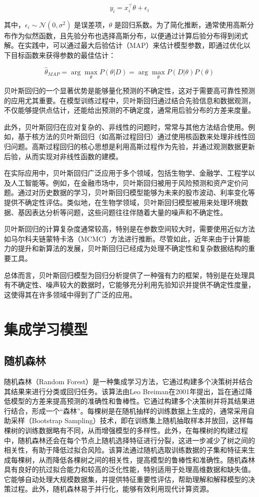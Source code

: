 \documentclass[AutoFakeBold]{LZUThesis-PgD&PhD}
\begin{document}
	\[
	y_i = x_i^\top \theta + \epsilon_i
	\]
	
	其中，$\epsilon_i \sim \mathcal{N}(0, \sigma^2)$ 是误差项，$\theta$ 是回归系数。为了简化推断，通常使用高斯分布作为似然函数，且先验分布也选择高斯分布，以便通过计算后验分布得到闭式解。在实践中，可以通过最大后验估计（MAP）来估计模型参数，即通过优化以下目标函数来获得参数的最佳估计：
	
	\[
	\hat{\theta}_{MAP} = \arg\max_\theta P(\theta | D) = \arg\max_\theta P(D | \theta) P(\theta)
	\]
	
	贝叶斯回归的一个显著优势是能够量化预测的不确定性，这对于需要高可靠性预测的应用尤其重要。在模型训练过程中，贝叶斯回归通过结合先验信息和数据观测，不仅能够提供点估计，还能给出预测的不确定度，通常用后验分布的方差来度量。
	
	此外，贝叶斯回归在应对复杂的、非线性的问题时，常常与其他方法结合使用。例如，基于核方法的贝叶斯回归（如高斯过程回归）通过使用核函数来处理非线性回归问题。高斯过程回归的核心思想是利用高斯过程作为先验，并通过观测数据更新后验，从而实现对非线性函数的建模。
	
	在实际应用中，贝叶斯回归广泛应用于多个领域，包括生物学、金融学、工程学以及人工智能等。例如，在金融市场中，贝叶斯回归被用于风险预测和资产定价问题。通过对历史数据的学习，贝叶斯回归模型能够为未来的股市波动、利率变化等提供不确定性评估。类似地，在生物学领域，贝叶斯回归模型被用来处理环境数据、基因表达分析等问题，这些问题往往伴随着大量的噪声和不确定性。
	
	贝叶斯回归的计算复杂度通常较高，特别是在参数空间较大时，需要使用近似方法如马尔科夫链蒙特卡洛（MCMC）方法进行推断。尽管如此，近年来由于计算能力的提升和新算法的发展，贝叶斯回归已经成为处理不确定性和复杂数据结构的重要工具。
	
	总体而言，贝叶斯回归模型为回归分析提供了一种强有力的框架，特别是在处理具有不确定性、噪声较大的数据时，它能够充分利用先验知识并提供不确定性度量，这使得其在许多领域中得到了广泛的应用。
	\section{集成学习模型}
	
	\subsection{随机森林}
	
	随机森林（Random Forest）是一种集成学习方法，它通过构建多个决策树并结合其结果来进行分类或回归任务。该算法由Leo Breiman在2001年提出，旨在通过降低模型的方差来提高预测的准确性和鲁棒性。它通过构建多个决策树并将其结果进行结合，形成一个“森林”。每棵树是在随机抽样的训练数据上生成的，通常采用自助采样（Bootstrap Sampling）技术，即在训练集上随机抽取样本并放回，这样每棵树的训练数据略有不同，从而增强模型的多样性。此外，在每棵树的构建过程中，随机森林还会在每个节点上随机选择特征进行分裂，这进一步减少了树之间的相关性，有助于降低过拟合风险。该算法通过随机选取训练数据的子集和特征来生成每棵树，从而降低各棵树之间的相关性，提高模型的鲁棒性和准确性。随机森林具有良好的抗过拟合能力和较高的泛化性能，特别适用于处理高维数据和缺失值。它能够自动处理大规模数据集，并提供特征重要性评估，帮助理解和解释模型的决策过程。此外，随机森林易于并行化，能够有效利用现代计算资源。
	
\end{document}

